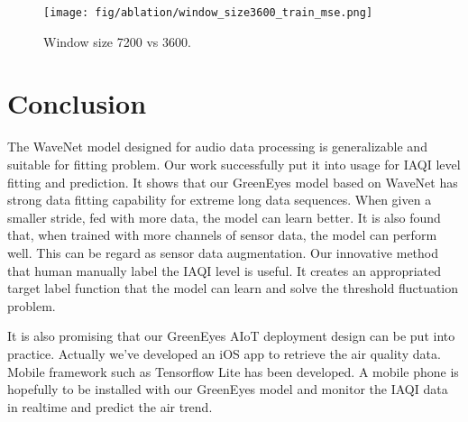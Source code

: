 \documentclass[sigconf]{acmart}
\begin{document}
\begin{figure}[!htbp]
    \centering
    \texttt{[image: fig/ablation/window\_size3600\_train\_mse.png]}
    \caption{Window size 7200 vs 3600.}
    \label{fig:window_size3600_train_mse}
\end{figure}


\section{Conclusion}

The WaveNet model designed for audio data processing is generalizable and suitable for fitting problem. Our work successfully put it into usage for IAQI level fitting and prediction. It shows that our GreenEyes model based on WaveNet has strong data fitting capability for extreme long data sequences. When given a smaller stride, fed with more data, the model can learn better. It is also found that, when trained with more channels of sensor data, the model can perform well. This can be regard as sensor data augmentation. Our innovative method that human manually label the IAQI level is useful. It creates an appropriated target label function that the model can learn and solve the threshold fluctuation problem.




It is also promising that our GreenEyes AIoT deployment design can be put into practice. Actually we've developed an iOS app to retrieve the air quality data. Mobile framework such as Tensorflow Lite \cite{louis2019towards} has been developed. A mobile phone is hopefully to be installed with our GreenEyes model and monitor the IAQI data in realtime and predict the air trend.
\end{document}
